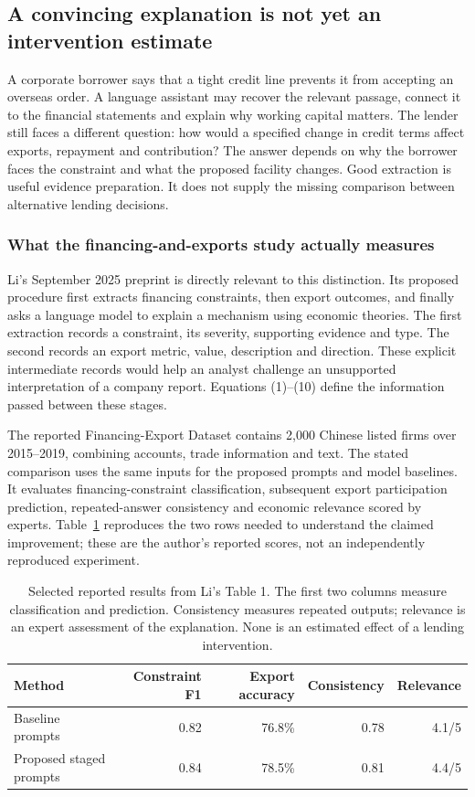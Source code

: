 \subsection{A convincing explanation is not yet an intervention estimate}
\label{closure30:formulation}

A corporate borrower says that a tight credit line prevents it from accepting
an overseas order. A language assistant may recover the relevant passage,
connect it to the financial statements and explain why working capital matters.
The lender still faces a different question: how would a specified change in
credit terms affect exports, repayment and contribution? The answer depends on
why the borrower faces the constraint and what the proposed facility changes.
Good extraction is useful evidence preparation. It does not supply the missing
comparison between alternative lending decisions.

\subsubsection{What the financing-and-exports study actually measures}

Li's September 2025 preprint is directly relevant to this distinction. Its
proposed procedure first extracts financing constraints, then export outcomes,
and finally asks a language model to explain a mechanism using economic
theories. The first extraction records a constraint, its severity, supporting
evidence and type. The second records an export metric, value, description and
direction. These explicit intermediate records would help an analyst challenge
an unsupported interpretation of a company report. Equations (1)--(10) define
the information passed between these stages. \citep[Sections 3.1--3.4]{rel18li}

The reported Financing-Export Dataset contains 2,000 Chinese listed firms
over 2015--2019, combining accounts, trade information and text. The stated
comparison uses the same inputs for the proposed prompts and model baselines.
It evaluates financing-constraint classification, subsequent export
participation prediction, repeated-answer consistency and economic relevance
scored by experts. Table~\ref{closure30:exports} reproduces the two rows needed
to understand the claimed improvement; these are the author's reported
scores, not an independently reproduced experiment.

\begin{table}[htbp]
\centering\small
\begin{tabular}{lrrrr}
\toprule
Method & Constraint F1 & Export accuracy & Consistency & Relevance\\
\midrule
Baseline prompts & 0.82 & 76.8\% & 0.78 & 4.1/5\\
Proposed staged prompts & 0.84 & 78.5\% & 0.81 & 4.4/5\\
\bottomrule
\end{tabular}
\caption{Selected reported results from Li's Table 1. The first two columns
measure classification and prediction. Consistency measures repeated outputs;
relevance is an expert assessment of the explanation. None is an estimated
effect of a lending intervention.}
\label{closure30:exports}
\end{table}

